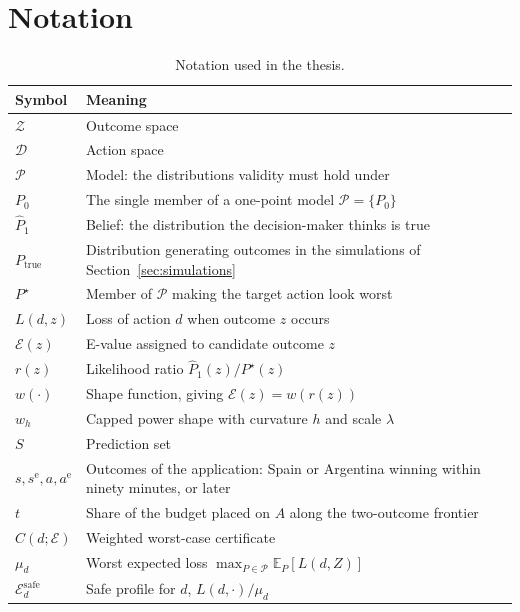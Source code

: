 \newpage
\section{Notation}\label{app:proofs}

\begin{table}[htbp]
\centering
\caption{Notation used in the thesis.}
\small
\begin{tabular}{@{}l>{\raggedright\arraybackslash}p{}@{}}\toprule
Symbol & Meaning \\\midrule
$\mathcal Z$ & Outcome space \\
$\mathcal D$ & Action space \\
$\mathcal P$ & Model: the distributions validity must hold under \\
$P_0$ & The single member of a one-point model $\mathcal P=\{P_0\}$ \\
$\widehat P_1$ & Belief: the distribution the decision-maker thinks is true \\
$P_{\mathrm{true}}$ & Distribution generating outcomes in the simulations of Section~\ref{sec:simulations} \\
$P^\star$ & Member of $\mathcal P$ making the target action look worst \\
$L(d,z)$ & Loss of action $d$ when outcome $z$ occurs \\
$\mathcal E(z)$ & E-value assigned to candidate outcome $z$ \\
$r(z)$ & Likelihood ratio $\widehat P_1(z)/P^\star(z)$ \\
$w(\cdot)$ & Shape function, giving $\mathcal E(z)=w(r(z))$ \\
$w_h$ & Capped power shape with curvature $h$ and scale $\lambda$ \\
$S$ & Prediction set \\
$s,s^{\mathrm e},a,a^{\mathrm e}$ & Outcomes of the application: Spain or Argentina winning within ninety minutes, or later \\
$t$ & Share of the budget placed on $A$ along the two-outcome frontier \\
$C(d;\mathcal E)$ & Weighted worst-case certificate \\
$\mu_d$ & Worst expected loss $\max_{P\in\mathcal P}\mathbb E_{P}[L(d,Z)]$ \\
$\mathcal E_d^{\mathrm{safe}}$ & Safe profile for $d$, $L(d,\cdot)/\mu_d$ \\

\end{tabular}
\end{table}

